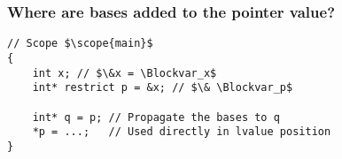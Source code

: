 \begin{frame}[fragile]
    \frametitle{Where are bases added to the pointer value?}

\begin{verbatim}
// Scope $\scope{main}$
{
    int x; // $\&x = \Blockvar_x$
    int* restrict p = &x; // $\& \Blockvar_p$

    int* q = p; // Propagate the bases to q
    *p = ...;   // Used directly in lvalue position 
}
\end{verbatim}
{
\hspace*{-10pt}
\scriptsize
\begin{prooftree}






\end{prooftree}
}





\end{frame}

